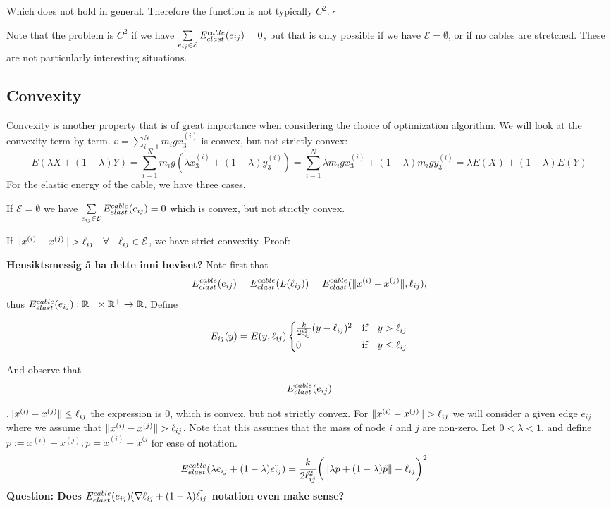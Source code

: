 Which does not hold in general. Therefore the function is not typically $C^2$. $\square$

Note that the problem is $C^2$ if we have
$\sum\limits_{e_{ij} \in \mathcal{E}} E^{cable}_{elast}(e_{ij}) = 0$, but that is only possible if we have $\mathcal{E} = \emptyset$, or if no cables are stretched. These are not particularly interesting situations.

\subsection{Convexity}
Convexity is another property that is of great importance when considering the choice of optimization algorithm. We will look at the convexity term by term.
$\ee =\sum_{i=1}^N m_i g x_3^{(i)}$ is convex, but not strictly convex:
\begin{equation*}
    E(\lambda X +(1-\lambda) Y) = \sum_{i=1}^N m_i g (\lambda x_3^{(i)} + (1-\lambda) y_3^{(i)})
    =\sum_{i=1}^N \lambda m_i g x_3^{(i)} + (1-\lambda) m_i g  y_3^{(i)} = \lambda E(X) + (1-\lambda) E(Y)
\end{equation*}
For the elastic energy of the cable, we have three cases. 

If $\mathcal{E} = \emptyset $ we have $\sum\limits_{e_{ij} \in \mathcal{E}} E^{cable}_{elast}(e_{ij}) = 0$ which is convex, but not strictly convex. 

If $\lVert x^{(i)} - x^{(j)}\rVert > \ell_{ij} \quad \forall \quad \ell_{ij} \in \mathcal{E}$, we have strict convexity. Proof:

\textbf{Hensiktsmessig å ha dette inni beviset?}
Note first that 
\begin{equation}
    E^{cable}_{elast}(e_{ij}) = E^{cable}_{elast}(L(\ell_{ij})) = E^{cable}_{elast}(\lVert x^{(i)} - x^{(j)}\rVert,\ell_{ij}),
\end{equation} thus $E^{cable}_{elast}(e_{ij}) : \mathbb{R}^+ \times \mathbb{R}^+ \rightarrow \mathbb{R}$. Define 

\begin{equation}
    E_{ij}(y) = E(y,\ell_{ij}) 
    \begin{cases}
    \frac{k}{2 \ell_{ij}^2} (y-\ell_{ij})^2 & \text{if} \quad y > \ell_{ij} \\
    0 & \text{if} \quad y \leq \ell_{ij}
    \end{cases}
\end{equation}

And observe that 
\begin{equation}
    E^{cable}_{elast}(e_{ij}) 
\end{equation}

,$\lVert x^{(i)} - x^{(j)}\rVert \leq \ell_{ij}$ the expression is $0$, which is convex, but not strictly convex. For $\lVert x^{(i)} - x^{(j)}\rVert > \ell_{ij}$
we will consider a given edge $e_{ij}$ where we assume that $\lVert x^{(i)} - x^{(j)}\rVert > \ell_{ij}$. Note that this assumes that the mass of node $i$ and $j$ are non-zero. Let $0 < \lambda < 1$, and define $p:=x^{(i)} - x^{(j)}, \tilde{p} = \tilde{x}^{(i)}-\tilde{x}^{(j}$ for ease of notation.
\begin{align*}
     E^{cable}_{elast}(\lambda e_{ij} + (1-\lambda) \tilde{e_{ij}}) &= \frac{k}{2 \ell_{ij}^2} \bigg( \lVert \lambda p + ( 1-\lambda ) \tilde{p} \rVert -\ell_{ij}\bigg)^2
\end{align*}
\textbf{Question: Does $E^{cable}_{elast}(e_{ij}) (\nabla \ell_{ij} + (1-\lambda) \tilde{\ell_{ij}}$ notation even make sense? }

